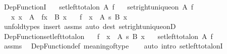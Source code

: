 \begin{isabellebody}
\isanewline
{}\isamarkupfalse%
\ Dep{\isacharunderscore}{\kern0pt}FunctionI{\isacharcolon}{\kern0pt}\isanewline
\ \ \ {\isachardoublequoteopen}set{\isacharunderscore}{\kern0pt}left{\isacharunderscore}{\kern0pt}total{\isacharunderscore}{\kern0pt}on\ A\ f{\isachardoublequoteclose}\isanewline
\ \ \ {\isachardoublequoteopen}set{\isacharunderscore}{\kern0pt}right{\isacharunderscore}{\kern0pt}unique{\isacharunderscore}{\kern0pt}on\ A\ f{\isachardoublequoteclose}\isanewline
\ \ \ {\isachardoublequoteopen}{\isasymAnd}x{\isachardot}{\kern0pt}\ x\ {\isacharcolon}{\kern0pt}\ A\ {\isasymLongrightarrow}\ f{\isacharbackquote}{\kern0pt}x\ {\isacharcolon}{\kern0pt}\ B\ x{\isachardoublequoteclose}\isanewline
\ \ \ {\isachardoublequoteopen}f\ {\isacharcolon}{\kern0pt}\ {\isacharparenleft}{\kern0pt}x\ {\isacharcolon}{\kern0pt}\ A{\isacharparenright}{\kern0pt}\ {\isasymrightarrow}s\ B\ x{\isachardoublequoteclose}\isanewline
%
\isadelimproof
\ \ %
\endisadelimproof
%
\isatagproof
{}\isamarkupfalse%
\ unfold{\isacharunderscore}{\kern0pt}types\ {\isacharparenleft}{\kern0pt}insert\ assms{\isacharcomma}{\kern0pt}\ auto\ dest{\isacharcolon}{\kern0pt}\ set{\isacharunderscore}{\kern0pt}right{\isacharunderscore}{\kern0pt}unique{\isacharunderscore}{\kern0pt}onD{\isacharparenright}{\kern0pt}%
\endisatagproof
{\isafoldproof}%
%
\isadelimproof
\isanewline
%
\endisadelimproof
\isanewline
{}\isamarkupfalse%
\ Dep{\isacharunderscore}{\kern0pt}Function{\isacharunderscore}{\kern0pt}set{\isacharunderscore}{\kern0pt}left{\isacharunderscore}{\kern0pt}total{\isacharunderscore}{\kern0pt}on{\isacharcolon}{\kern0pt}\isanewline
\ \ \ {\isachardoublequoteopen}f\ {\isacharcolon}{\kern0pt}\ {\isacharparenleft}{\kern0pt}x\ {\isacharcolon}{\kern0pt}\ A{\isacharparenright}{\kern0pt}\ {\isasymrightarrow}s\ B\ x{\isachardoublequoteclose}\isanewline
\ \ \ {\isachardoublequoteopen}set{\isacharunderscore}{\kern0pt}left{\isacharunderscore}{\kern0pt}total{\isacharunderscore}{\kern0pt}on\ A\ f{\isachardoublequoteclose}\isanewline
\ \ \isanewline
%
\isadelimproof
\ \ %
\endisadelimproof
%
\isatagproof
{}\isamarkupfalse%
\ assms\ \isamarkupfalse%
\ Dep{\isacharunderscore}{\kern0pt}Function{\isacharunderscore}{\kern0pt}def\ meaning{\isacharunderscore}{\kern0pt}of{\isacharunderscore}{\kern0pt}type\isanewline
\ \ \isamarkupfalse%
\ {\isacharparenleft}{\kern0pt}auto\ intro{\isacharbang}{\kern0pt}{\isacharcolon}{\kern0pt}\ set{\isacharunderscore}{\kern0pt}left{\isacharunderscore}{\kern0pt}total{\isacharunderscore}{\kern0pt}onI{\isacharparenright}{\kern0pt}%

\end{isabellebody}
